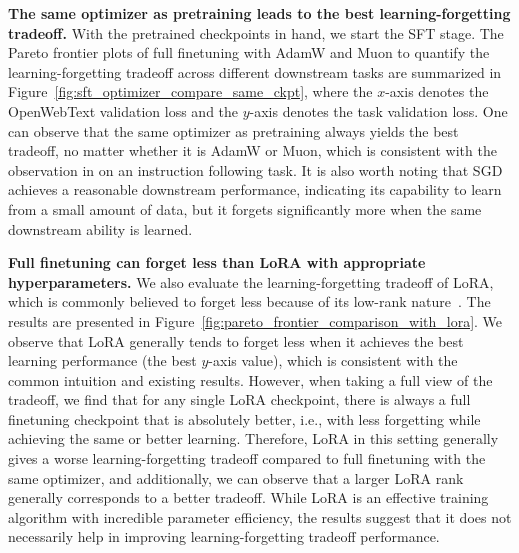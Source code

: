 \documentclass{article}
\theoremstyle{remark}
\begin{document}
\textbf{The same optimizer as pretraining leads to the best learning-forgetting tradeoff.}
With the pretrained checkpoints in hand, we start the SFT stage.
The Pareto frontier plots of full finetuning with AdamW and Muon to quantify the learning-forgetting tradeoff across different downstream tasks are summarized in Figure~\ref{fig:sft_optimizer_compare_same_ckpt}, where the $x$-axis denotes the OpenWebText validation loss and the $y$-axis denotes the task validation loss. One can observe that the same optimizer as pretraining always yields the best tradeoff, no matter whether it is AdamW or Muon, which is consistent with the observation in \citet{liu2025muon} on an instruction following task. It is also worth noting that SGD achieves a reasonable downstream performance, indicating its capability to learn from a small amount of data, but it forgets significantly more when the same downstream ability is learned. 











\textbf{Full finetuning can forget less than LoRA with appropriate hyperparameters.}
We also evaluate the learning-forgetting tradeoff of LoRA, which is commonly believed to forget less because of its low-rank nature~\citep{biderman2024lora}. The results are presented in Figure~\ref{fig:pareto_frontier_comparison_with_lora}. We observe that LoRA generally tends to forget less when it achieves the best learning performance (the best $y$-axis value), which is consistent with the common intuition and existing results. 
However, when taking a full view of the tradeoff, we find that for any single LoRA checkpoint, there is always a full finetuning checkpoint that is absolutely better, i.e., with less forgetting while achieving the same or better learning.
Therefore, LoRA in this setting generally gives a worse learning-forgetting tradeoff compared to full finetuning with the same optimizer, and additionally, we can observe that a larger LoRA rank generally corresponds to a better tradeoff. 
While LoRA is an effective training algorithm with incredible parameter efficiency, the results suggest that it does not necessarily help in improving learning-forgetting tradeoff performance.
\end{document}
